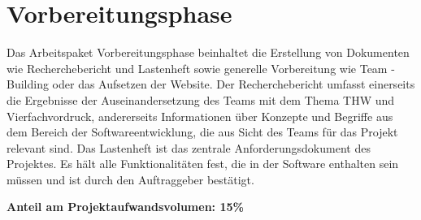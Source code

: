 \section{Vorbereitungsphase}
Das Arbeitspaket Vorbereitungsphase beinhaltet die Erstellung von Dokumenten 
wie Recherchebericht und Lastenheft sowie generelle Vorbereitung wie Team
-Building oder das Aufsetzen der Website.
Der Recherchebericht umfasst einerseits die Ergebnisse der Auseinandersetzung 
des Teams mit dem Thema THW und Vierfachvordruck, andererseits Informationen 
über Konzepte und Begriffe aus dem Bereich der Softwareentwicklung, die aus 
Sicht des Teams für das Projekt relevant sind.
Das Lastenheft ist das zentrale Anforderungsdokument des Projektes. Es hält 
alle Funktionalitäten fest, die in der Software enthalten sein müssen und 
ist durch den Auftraggeber bestätigt.

\textbf{Anteil am Projektaufwandsvolumen: 15\%}